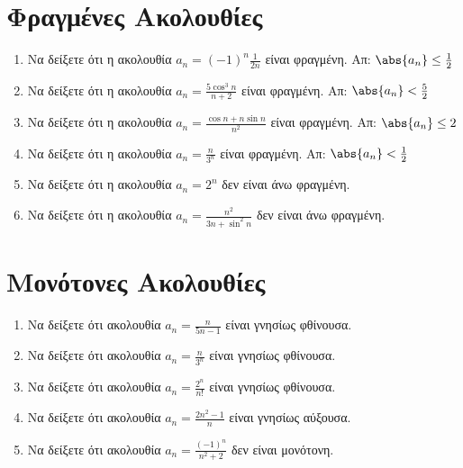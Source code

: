 


\everymath{\displaystyle}
\pagestyle{vangelis}



\begin{center}
  \minibox[c]{\large \bfseries \textcolor{Col1}{Ακολουθίες}\\ \large 
  \textcolor{Col1}{Ασκήσεις}}
\end{center}

\vspace{\baselineskip}


\setcounter{chapter}{1}
\section*{Φραγμένες Ακολουθίες}

\begin{enumerate}
  \item Να δείξετε ότι η ακολουθία $ a_{n} = (-1)^{n}\frac{1}{2n} $ είναι 
    φραγμένη.
    \hfill Απ: $ \abs{a_{n}} \leq \frac{1}{2} $ 
  \item Να δείξετε ότι η ακολουθία $ a_{n} = \frac{5 \cos^{3}{n}}{n+2} $ 
    είναι φραγμένη.
    \hfill Απ: $ \abs{a_{n}} < \frac{5}{2}  $ 
  \item Να δείξετε ότι η ακολουθία $ a_{n} = \frac{\cos{n} + n \sin{n}}{n^{2}} $ 
    είναι φραγμένη. 
    \hfill Απ: $ \abs{a_{n}} \leq 2 $ 
  \item Να δείξετε ότι η ακολουθία $ a_{n} = \frac{n}{3^{n}} $ είναι 
    φραγμένη. 
    \hfill Απ: $ \abs{a_{n}}< \frac{1}{2} $
  \item Να δείξετε ότι η ακολουθία $ a_{n} = 2^{n} $ δεν είναι άνω 
    φραγμένη.
  \item Να δείξετε ότι η ακολουθία $ a_{n} = \frac{n^{2}}{3n+ \sin^{2}{n}} $ δεν 
    είναι άνω φραγμένη.
\end{enumerate}

\section*{Μονότονες Ακολουθίες}

\begin{enumerate}
  \item Να δείξετε ότι ακολουθία $ a_{n} = \frac{n}{5n-1} $ είναι 
    γνησίως φθίνουσα.
  \item Να δείξετε ότι ακολουθία $ a_{n} = \frac{n}{3^{n}} $ είναι 
    γνησίως φθίνουσα.
  \item Να δείξετε ότι ακολουθία $ a_{n} = \frac{2^{n}}{n!} $ είναι 
    γνησίως φθίνουσα.
  \item Να δείξετε ότι ακολουθία $ a_{n} = \frac{2n^{2}-1}{n} $ είναι γνησίως 
    αύξουσα.
  \item Να δείξετε ότι ακολουθία $ a_{n} =  \frac{(-1)^{n}}{n^{2}+2} $ 
    δεν είναι μονότονη.
\end{enumerate}



